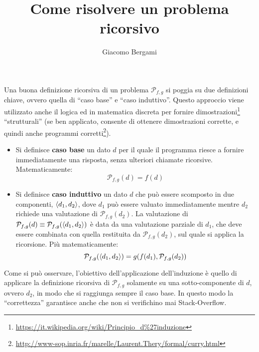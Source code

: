 \documentclass[]{scrartcl}
\title{Come risolvere un problema ricorsivo}
\author{Giacomo Bergami}
\newcommand{\prog}{\ensuremath{\mathcal{P}_{f,g}}}
\begin{document}
\maketitle


\section{}
Una buona definizione ricorsiva di un problema $\prog$ si poggia su due definizioni chiave, ovvero quella di ``caso base'' e ``caso induttivo''. Questo approccio viene utilizzato anche il logica ed in matematica discreta per fornire dimostrazioni\footnote{\url{https://it.wikipedia.org/wiki/Principio_d\%27induzione}} ``strutturali'' (se ben applicato, consente di ottenere dimostrazioni corrette, e quindi anche programmi corretti\footnote{\url{http://www-sop.inria.fr/marelle/Laurent.Thery/formal/curry.html}}).
\begin{itemize}
	\item Si definisce \textbf{caso base} un dato $d$ per il quale il programma riesce a fornire immediatamente una risposta, senza ulteriori chiamate ricorsive. Matematicamente:
	\[\prog(d)=f(d)\]
	\item Si definisce \textbf{caso induttivo} un dato $d$ che può essere scomposto in due componenti, $\Braket{d_1,d_2}$, dove $d_1$ può essere valuato immediatamente mentre $d_2$ richiede una valutazione di $\prog(d_2)$. La valutazione di $\prog(d)\equiv \prog(\Braket{d_1,d_2})$ è data da una valutazione parziale di $d_1$, che deve essere combinata con quella restituita da $\prog(d_2)$, sul quale si applica la ricorsione. Più matematicamente:
	\[\prog(\Braket{d_1,d_2})=g(f(d_1),\prog(d_2))\]
\end{itemize}
 Come si può osservare, l'obiettivo dell'applicazione dell'induzione è quello di applicare la definizione ricorsiva di $\prog$ solamente su una sotto-componente di $d$, ovvero $d_2$, in modo che si raggiunga sempre il caso base. In questo modo la ``correttezza'' garantisce anche che non si verifichino mai Stack-Overflow.
\medskip
\end{document}

